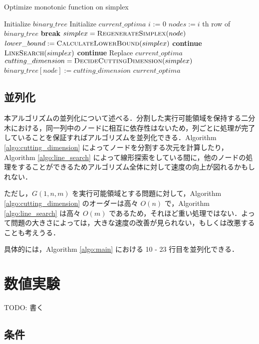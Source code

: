 \documentclass[a4paper,11pt]{jreport}
\newcommand{\Continue}{\State \textbf{continue} }
\newcommand{\Break}{\State \textbf{break} }
\begin{document}
\begin{algorithm}
\caption{Optimize monotonic function on simplex}
\label{algo:main}
\begin{algorithmic}[1]
\State Initialize $ binary\_tree $
\State Initialize $ current\_optima $
\State $ i $ := 0
\State $ nodes := i $ th row of $ binary\_tree $
\Break
\EndIf
{}
\State $ simplex = \Call{RegenerateSimplex}{node} $
\State $ lower\_bound := \Call{CalculateLowerBound}{simplex} $
\Continue
\EndIf
{}
\State $ \Call{LineSearch}{simplex} $
\Continue
\EndIf
{}
\State Replace $ current\_optima $
\EndIf
\State $ cutting\_dimension = \Call{DecideCuttingDimension}{simplex} $
\State $ binary\_tree[node] := cutting\_dimension $
\EndFor
\EndWhile
\State \Return $ current\_optima $
\end{algorithmic}
\end{algorithm}

\section{並列化}

本アルゴリズムの並列化について述べる．分割した実行可能領域を保持する二分木における，同一列中のノードに相互に依存性はないため，列ごとに処理が完了していることを保証すればアルゴリズムを並列化できる．Algorithm \ref{algo:cutting_dimension} によってノードを分割する次元を計算したり，Algorithm \ref{algo:line_search} によって線形探索をしている間に，他のノードの処理をすることができるためアルゴリズム全体に対して速度の向上が図れるかもしれない．\par
ただし，$ G(1, n, m) $ を実行可能領域とする問題に対して，Algorithm \ref{algo:cutting_dimension} のオーダーは高々 $ O(n) $ で，Algorithm \ref{algo:line_search} は高々 $ O(m) $ であるため，それほど重い処理ではない．よって問題の大きさによっては，大きな速度の改善が見られない，もしくは改悪することも考えうる．\par
具体的には，Algorithm \ref{algo:main} における 10 - 23 行目を並列化できる．

\chapter{数値実験}

TODO: 書く
\section{条件}
\end{document}
